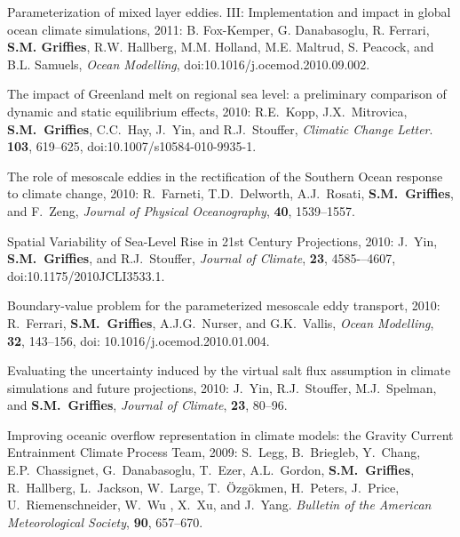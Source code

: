 \begin{etaremune}
\item Parameterization of mixed layer eddies. III: Implementation and impact in global ocean climate simulations, 2011: B. Fox-Kemper,
  G. Danabasoglu, R. Ferrari, {\bf S.M. Grif\/f\/ies}, R.W. Hallberg, M.M. Holland, M.E. Maltrud, S. Peacock, and B.L. Samuels, {\it Ocean Modelling}, doi:10.1016/j.ocemod.2010.09.002.

\item The impact of Greenland melt on regional sea level: a preliminary comparison of dynamic and static equilibrium effects, 2010: R.E.\ Kopp, J.X.\ Mitrovica, {\bf S.M.\ Grif\/f\/ies}, C.C.\  Hay, J.\ Yin, and R.J.\ Stouffer, {\it Climatic Change Letter}.\,
  {\bf 103}, 619--625, doi:10.1007/s10584-010-9935-1.

\item The role of mesoscale eddies in the rectification of the Southern Ocean response to climate change, 2010: R.\ Farneti, T.D.\
  Delworth, A.J.\ Rosati, {\bf S.M.\ Grif\/f\/ies}, and F.\ Zeng, {\it Journal of Physical Oceanography}, {\bf 40}, 1539--1557.

\item Spatial Variability of Sea-Level Rise in 21st Century Projections, 2010: J.\ Yin, {\bf S.M.\ Grif\/f\/ies}, and R.J.\ Stouffer, {\it Journal of Climate}, {\bf 23}, 4585-–4607,
doi:10.1175/2010JCLI3533.1.

\item Boundary-value problem for the parameterized mesoscale eddy transport, 2010: R.\ Ferrari, {\bf S.M.\ Grif\/f\/ies}, A.J.G.\
  Nurser, and G.K.\ Vallis, {\em Ocean Modelling}, {\bf 32}, 143--156, doi: 10.1016/j.ocemod.2010.01.004.

\item Evaluating the uncertainty induced by the virtual salt flux assumption in climate simulations and future projections, 2010: J.\
  Yin, R.J.\ Stouffer, M.J.\ Spelman, and {\bf S.M.\ Grif\/f\/ies}, {\em Journal of Climate}, {\bf 23}, 80--96.

\item Improving oceanic overflow representation in climate models: the   Gravity Current Entrainment Climate Process Team, 2009: S.\ Legg, B.\ Briegleb, Y.\ Chang, E.P.\ Chassignet, G.\ Danabasoglu, T.\
  Ezer, A.L.\ Gordon, {\bf S.M.\ Grif\/f\/ies}, R.\ Hallberg, L.\ Jackson, W.\ Large, T.\ \"Ozg\"okmen, H.\ Peters, J.\ Price, U.\
  Riemenschneider, W.\ Wu , X.\ Xu, and J.\ Yang.  {\em Bulletin of the American Meteorological Society}, {\bf 90}, 657--670.


\end{etaremune}
